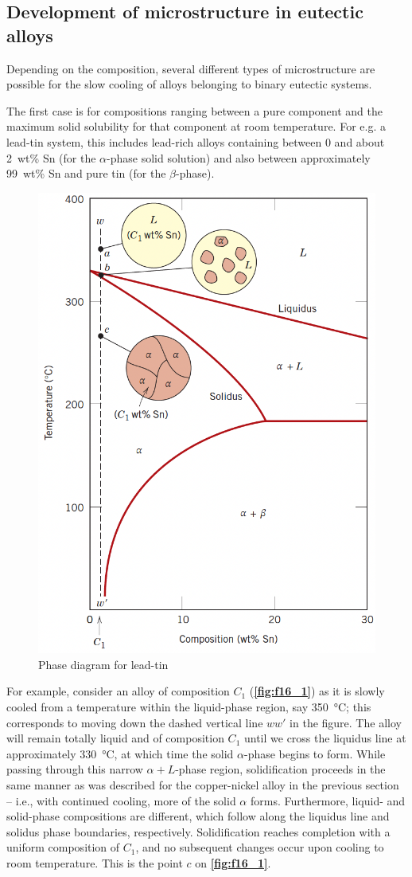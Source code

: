

\subsection{Development of microstructure in eutectic alloys}
Depending on the composition, several different types of microstructure are possible for the slow cooling of alloys belonging to binary eutectic systems.

The first case is for compositions ranging between a pure component and the maximum solid solubility for that component at room temperature. For e.g. a lead-tin system, this includes lead-rich alloys containing between 0 and about \qty{2}{wt}\% Sn (for the $\alpha$-phase solid solution) and also between approximately \qty{99}{wt}\% Sn and pure tin (for the $\beta$-phase). 

\begin{figure} [ht]
  \centering
  \includegraphics[width=0.35\linewidth]{./figures/f16_1.png}
  \caption{Phase diagram for lead-tin}
  \label{fig:f16_1}
\end{figure}
For example, consider an alloy of composition $C_1$ (\textbf{\autoref{fig:f16_1}}) as it is slowly cooled from a temperature within the liquid-phase region, say \qty{350}{\celsius}; this corresponds to moving down the dashed vertical line $ww'$ in the figure. The alloy will remain totally liquid and of composition $C_1$ until we cross the liquidus line at approximately \qty{330}{\celsius}, at which time the solid $\alpha$-phase begins to form. While passing through this narrow $\alpha + L$-phase region, solidification proceeds in the same manner as was described for the copper-nickel alloy in the previous section -- i.e., with continued cooling, more of the solid $\alpha$ forms. Furthermore, liquid- and solid-phase compositions are different, which follow along the liquidus line and solidus phase boundaries, respectively. Solidification reaches completion with a uniform composition of $C_1$, and no subsequent changes occur upon cooling to room temperature. This is the point $c$ on \textbf{\autoref{fig:f16_1}}.

